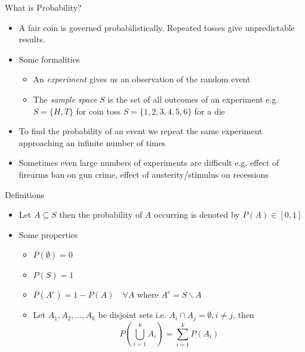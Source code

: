 \documentclass{beamer}
\begin{document}
\begin{frame}{What is Probability?} 
\begin{itemize}
 \item A fair coin is governed probabilistically. Repeated tosses give unpredictable results. 
 \item Some formalities 
 \begin{itemize}
 \item An \emph{experiment} gives us an observation of the random event
 \item The \emph{sample space} $S$ is the set of all outcomes of an experiment e.g. $S = \{H, T\}$ for coin toss $S = \{1,2,3,4,5,6\}$ for a die  
 \end{itemize} 
 \item To find the probability of an event we repeat the same experiment approaching an infinite number of times 
 \item Sometimes even large numbers of experiments are difficult e.g. effect of firearms ban on gun crime, effect of austerity/stimulus on recessions 
\end{itemize}
\end{frame}

\begin{frame}{Definitions}
\begin{itemize}
 \item Let $A \subseteq S$ then the probability of $A$ occurring is denoted by $P(A) \in [0, 1]$
 \item Some properties 
 \begin{itemize}
 \item $P(\emptyset) = 0$
 \item $P(S) = 1$
 \item $P(A^c) = 1 - P(A) \quad \forall A$  where $A^c = S \backslash A$
 \item Let $A_1, A_2, \ldots, A_k$ be disjoint sets i.e. $A_i \cap A_j = \emptyset, i \neq j$, then 
 \begin{displaymath} 
  P\left(\bigcup_{i=1}^k A_i \right) = \sum_{i=1}^k P(A_i)
 \end{displaymath}

 \end{itemize} 
\end{itemize}
 
\end{frame}
\end{document}
